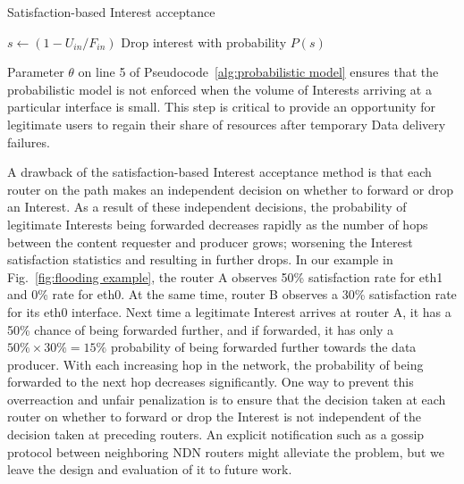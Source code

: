 \documentclass[10pt,conference]{IEEEtran}
\renewcommand{\texttt}[1]{{\nicettfont #1}}
\begin{document}
\begin{algorithm}[t]
\footnotesize
\caption{\small Satisfaction-based Interest acceptance}
\label{alg:probabilistic model}
\begin{algorithmic}[1]
\State{} 

\vspace{0.1cm}

    \State{} 
    \State{} 
    
     
        \State $s \leftarrow (1 - U_{in} / F_{in})$
        \State Drop interest with probability $P(s)$
    \EndIf

\EndFunction

\end{algorithmic}
\end{algorithm}

Parameter $\theta$ on line 5 of Pseudocode~\ref{alg:probabilistic model} ensures that the probabilistic model is not enforced when the volume of Interests arriving at a particular interface is small. This step is critical to provide an opportunity for legitimate users to regain their share of resources after temporary Data delivery failures.

A drawback of the satisfaction-based Interest acceptance method is that each router on the path makes an independent decision on whether to forward or drop an Interest. 
As a result of these independent decisions,  the probability of legitimate Interests being forwarded decreases rapidly as the number of hops between the content requester and producer grows; worsening the Interest satisfaction statistics and resulting in further drops.
In our example in Fig.~\ref{fig:flooding example}, the router A observes 50\% satisfaction rate for \texttt{eth1} and 0\% rate for \texttt{eth0}. 
At the same time, router B observes a 30\% satisfaction rate for its \texttt{eth0} interface.
Next time a legitimate Interest arrives at router A, it has a 50\% chance of being forwarded further, and if forwarded, it has only a $50\% \times 30\% = 15\%$ probability of being forwarded further towards the data producer. With each increasing hop in the network, the probability of being forwarded to the next hop decreases significantly. 
One way to prevent this overreaction and unfair penalization is to ensure that the decision taken at each router on whether to forward or drop the Interest is not independent of the decision taken at preceding routers. An explicit notification such as a gossip protocol between neighboring NDN routers might alleviate the problem, but we leave the design and evaluation of it to future work.
\end{document}
